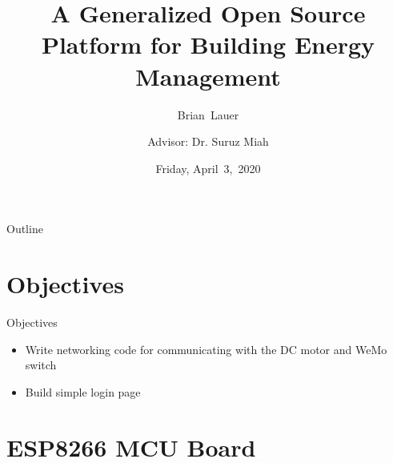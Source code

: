 \documentclass{beamer}
\title[Progress Update]{A Generalized Open Source Platform for Building Energy Management}
\author[B.~Lauer]{Brian~Lauer \\\and
Advisor: Dr. Suruz Miah}
\institute[Bradley University] %
{
  Department of Electrical and Computer Engineering\\
  Bradley University\\
  1501 W. Bradley Avenue\\
  Peoria, IL, 61625, USA
}
\date[April~3,~2020]{Friday, April~3,~2020}
\begin{document}
\begin{frame}
  \titlepage
\end{frame}

\begin{frame}{Outline}
  \tableofcontents
\end{frame}

\section{Objectives}

\begin{frame}{Objectives}{}
  \begin{itemize}
	\item Write networking code for communicating with the DC motor and WeMo switch
	\item Build simple login page  
  \end{itemize}
\end{frame}

\section{ESP8266 MCU Board}
\end{document}
